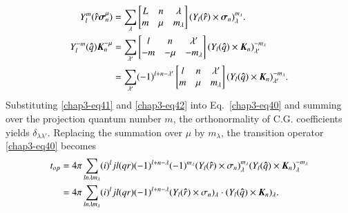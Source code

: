 \begin{align}
  Y_l^m ({\boldsymbol \hat{r}} {\boldsymbol \sigma}_n^\mu) & = \sum_{\lambda}
  \begin{bmatrix} L & n & \lambda\\ m & \mu & m_\lambda \end{bmatrix} (Y_l ({\boldsymbol \hat{r}}) \times {\boldsymbol \sigma_n})_\lambda^{m_\lambda}. \label{chap3-eq41}\\
  Y_l^{-m} ({\boldsymbol \hat{q}}) {\boldsymbol K}_n^{-\mu} & = \sum_{\lambda'}
  \begin{bmatrix}    l & n & \lambda' \\ -m & -\mu & -m_\lambda  \end{bmatrix}
  (Y_l ({\boldsymbol \hat{q}}) \times {\boldsymbol K}_n)_{\lambda'}^{-m_\lambda} \notag \\
  & = \sum_{\lambda '} (-1)^{l + n - \lambda'}
  \begin{bmatrix}    l & n & \lambda'\\ m & \mu & m_\lambda  \end{bmatrix}
  (Y_l ({\boldsymbol \hat{q}}) \times {\boldsymbol K}_n)_{\lambda'}^{-m_\lambda}. \label{chap3-eq42}
\end{align}
Substituting \eqref{chap3-eq41} and \eqref{chap3-eq42} into Eq.\ \eqref{chap3-eq40} and summing over the projection quantum number $m$, the orthonormality of C.G. coefficients yields $\delta_{\lambda \lambda'}$. Replacing the summation over $\mu$ by $m_{\lambda}$, the transition operator \eqref{chap3-eq40} becomes
\begin{align}
  t_{op} & = 4 \pi \sum_{ln \lambda m_\lambda} (i)^l jl (qr) (-1)^{l + n - \lambda} (-1)^{m_\lambda} (Y_l({\boldsymbol \hat{r}}) \times \sigma_n)_\lambda^{m_\lambda} (Y_l ({\boldsymbol \hat{q}}) \times {\boldsymbol K}_n)_\lambda^{-m_\lambda} \notag \\
  & = 4 \pi \sum_{ln \lambda m_\lambda} (i)^l jl (qr) (-1)^{l+n-\lambda} (Y_l ({\boldsymbol \hat{r}}) \times \sigma_{n})_\lambda \cdot (Y_l ({\boldsymbol \hat{q}}) \times {\boldsymbol K}_n)_\lambda. \label{chap3-eq43}
\end{align}

